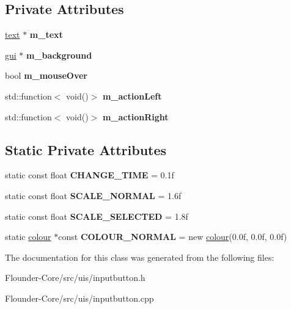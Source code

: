 \subsection*{Private Attributes}
\begin{DoxyCompactItemize}
\item 
\mbox{\label{classflounder_1_1inputbutton_a926e89497fe3ccbda14181e7a4302e7c}} 
\hyperlink{classflounder_1_1text}{text} $\ast$ {\bfseries m\+\_\+text}
\item 
\mbox{\label{classflounder_1_1inputbutton_aa643dc8120e533a926c8eaad49948153}} 
\hyperlink{classflounder_1_1gui}{gui} $\ast$ {\bfseries m\+\_\+background}
\item 
\mbox{\label{classflounder_1_1inputbutton_acaf1e6360396163866c798e555eb25c7}} 
bool {\bfseries m\+\_\+mouse\+Over}
\item 
\mbox{\label{classflounder_1_1inputbutton_a5ebc92aeb01736013eaa7fdd2833f525}} 
std\+::function$<$ void()$>$ {\bfseries m\+\_\+action\+Left}
\item 
\mbox{\label{classflounder_1_1inputbutton_aceff532fcea01bea6ee446d992e4d794}} 
std\+::function$<$ void()$>$ {\bfseries m\+\_\+action\+Right}
\end{DoxyCompactItemize}
\subsection*{Static Private Attributes}
\begin{DoxyCompactItemize}
\item 
\mbox{\label{classflounder_1_1inputbutton_aa53987077c50fab936063854c997c121}} 
static const float {\bfseries C\+H\+A\+N\+G\+E\+\_\+\+T\+I\+ME} = 0.\+1f
\item 
\mbox{\label{classflounder_1_1inputbutton_af37430ac9a5915cd2b1e6d41ddf30e5e}} 
static const float {\bfseries S\+C\+A\+L\+E\+\_\+\+N\+O\+R\+M\+AL} = 1.\+6f
\item 
\mbox{\label{classflounder_1_1inputbutton_a0c7575290d6017076f3049e8528fc94c}} 
static const float {\bfseries S\+C\+A\+L\+E\+\_\+\+S\+E\+L\+E\+C\+T\+ED} = 1.\+8f
\item 
\mbox{\label{classflounder_1_1inputbutton_a02138feaaf1fcf1e71de1ffd1201c2ea}} 
static \hyperlink{classflounder_1_1colour}{colour} $\ast$const {\bfseries C\+O\+L\+O\+U\+R\+\_\+\+N\+O\+R\+M\+AL} = new \hyperlink{classflounder_1_1colour}{colour}(0.\+0f, 0.\+0f, 0.\+0f)
\end{DoxyCompactItemize}


The documentation for this class was generated from the following files\+:\begin{DoxyCompactItemize}
\item 
Flounder-\/\+Core/src/uis/inputbutton.\+h\item 
Flounder-\/\+Core/src/uis/inputbutton.\+cpp\end{DoxyCompactItemize}
